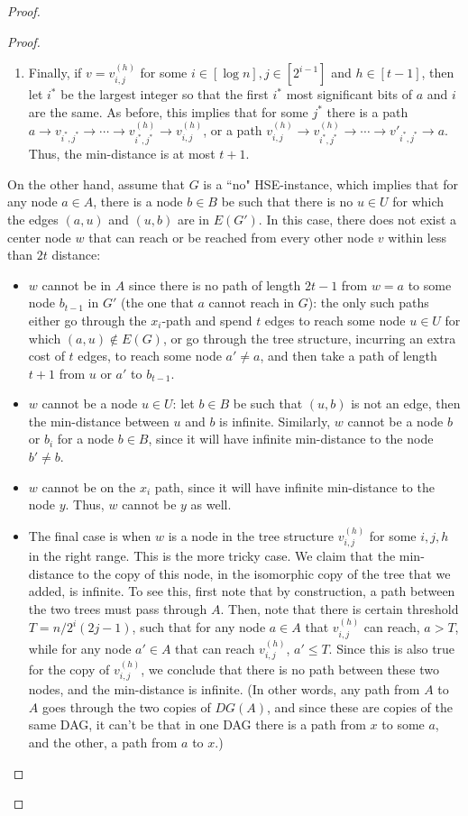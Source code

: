 \begin{proof}
\begin{proof}
\begin{enumerate}
\item Finally, if $v= v^{(h)}_{i,j}$ for some $i \in [\log{n}], j \in[2^{i-1}]$ and $h \in [t-1]$, then let $i^*$ be the largest integer so that the first $i^*$ most significant bits of $a$ and $i$ are the same. As before, this implies that for some $j^*$ there is a path $a \to v_{i^*,j^*} \to \cdots \to v^{(h)}_{i^*,j^*} \to v^{(h)}_{i,j}$, or a path $v^{(h)}_{i,j} \to v^{(h)}_{i^*,j^*} \to \cdots \to v'_{i^*,j^*} \to a$. Thus, the min-distance is at most $t+1$.

\end{enumerate}

On the other hand, assume that $G$ is a ``no" HSE-instance, which implies that for any node $a\in A$, there is a node $b \in B$ be such that there is no $u \in U$ for which the edges $(a,u)$ and $(u,b)$ are in $E(G')$. 
In this case, there does not exist a center node $w$ that can reach or be reached from every other node $v$ within less than $2t$ distance:
\begin{itemize}
\item $w$ cannot be in $A$ since there is no path of length $2t-1$ from $w=a$ to some node $b_{t-1}$ in $G'$ (the one that $a$ cannot reach in $G$): the only such paths either go through the $x_i$-path and spend $t$ edges to reach some node $u \in U$ for which $(a,u)\notin E(G)$, or go through the tree structure, incurring an extra cost of $t$ edges, to reach some node $a' \neq a$, and then take a path of length $t+1$ from $u$ or $a'$ to $b_{t-1}$.
\item $w$ cannot be a node $u \in U$: let $b \in B$ be such that $(u,b)$ is not an edge, then the min-distance between $u$ and $b$ is infinite. Similarly, $w$ cannot be a node $b$ or $b_i$ for a node $b \in B$, since it will have infinite min-distance to the node $b'\neq b$.
\item $w$ cannot be on the $x_i$ path, since it will have infinite min-distance to the node $y$. Thus, $w$ cannot be $y$ as well.
\item  The final case is when $w$ is a node in the tree structure $v^{(h)}_{i,j}$ for some $i,j,h$ in the right range.
This is the more tricky case.
We claim that the min-distance to the copy of this node, in the isomorphic copy of the tree that we added, is infinite. 
To see this, first note that by construction, a path between the two trees must pass through $A$.
Then, note that there is certain threshold $T=n/2^i (2j-1)$, such that for any node $a \in A$ that $v^{(h)}_{i,j}$ can reach, $a> T$, while for any node $a' \in A$ that can reach $v^{(h)}_{i,j}$, $a' \leq T$. 
Since this is also true for the copy of $v^{(h)}_{i,j}$, we conclude that there is no path between these two nodes, and the min-distance is infinite. (In other words, any path from $A$ to $A$ goes through the two copies of $DG(A)$, and since these are copies of the same DAG, it can't be that in one DAG there is a path from $x$ to some $a$, and the other, a path from $a$ to $x$.)
\end{itemize}


\end{proof}
\end{proof}
